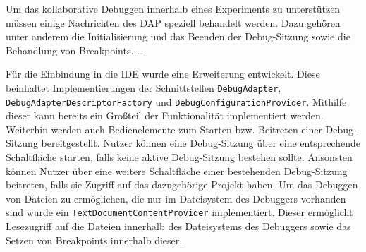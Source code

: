 Um das kollaborative Debuggen innerhalb eines Experiments zu unterstützen müssen einige Nachrichten des \ac{DAP} speziell behandelt werden. Dazu gehören unter anderem die Initialisierung und das Beenden der Debug-Sitzung sowie die Behandlung von Breakpoints. \dots {} 

Für die Einbindung in die IDE wurde eine Erweiterung entwickelt. Diese beinhaltet Implementierungen der Schnittstellen \texttt{DebugAdapter}, \texttt{DebugAdapterDescriptorFactory} und \texttt{DebugConfigurationProvider}. Mithilfe dieser kann bereits ein Großteil der Funktionalität implementiert werden. Weiterhin werden auch Bedienelemente zum Starten bzw. Beitreten einer Debug-Sitzung bereitgestellt. Nutzer können eine Debug-Sitzung über eine entsprechende Schaltfläche starten, falls keine aktive Debug-Sitzung bestehen sollte. Ansonsten können Nutzer über eine weitere Schaltfläche einer bestehenden Debug-Sitzung beitreten, falls sie Zugriff auf das dazugehörige Projekt haben. Um das Debuggen von Dateien zu ermöglichen, die nur im Dateisystem des Debuggers vorhanden sind wurde ein \texttt{TextDocumentContentProvider} implementiert. Dieser ermöglicht Lesezugriff auf die Dateien innerhalb des Dateisystems des Debuggers sowie das Setzen von Breakpoints innerhalb dieser.